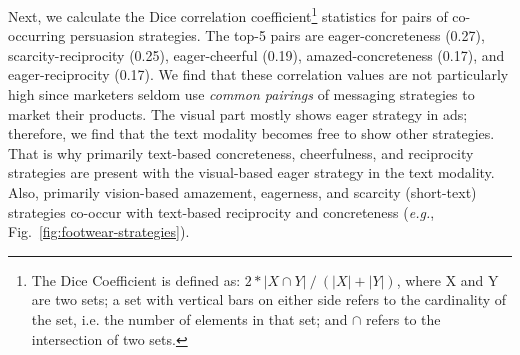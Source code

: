 \documentclass[hidelinks,11pt,a4paper]{report}
\begin{document}
Next, we calculate the Dice correlation coefficient\footnote{The Dice Coefficient is defined as: \; \(2*|X \cap Y|\: / \:(|X|+|Y|)\), where X and Y are two sets; a set with vertical bars on either side refers to the cardinality of the set, i.e. the number of elements in that set; and \(\cap\)  refers to the intersection of two sets.} statistics for pairs of co-occurring persuasion strategies. The top-5 pairs are eager-concreteness (0.27), scarcity-reciprocity (0.25), eager-cheerful (0.19), amazed-concreteness (0.17), and eager-reciprocity (0.17). We find that these correlation values are not particularly high since marketers seldom use \textit{common pairings} of messaging strategies to market their products. The visual part mostly shows eager strategy in ads; therefore, we find that the text modality becomes free to show other strategies. That is why primarily text-based concreteness, cheerfulness, and reciprocity strategies are present with the visual-based eager strategy in the text modality. Also, primarily vision-based amazement, eagerness, and scarcity (short-text) strategies co-occur with text-based reciprocity and concreteness (\textit{e.g.}, Fig.~\ref{fig:footwear-strategies}).
\end{document}
